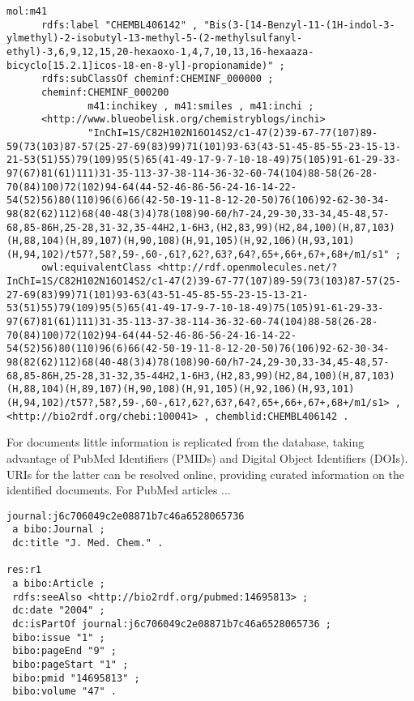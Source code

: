 \documentclass[sw]{iosart2c}
\begin{document}
\begin{tiny}
\begin{verbatim}
mol:m41
      rdfs:label "CHEMBL406142" , "Bis(3-[14-Benzyl-11-(1H-indol-3-ylmethyl)-2-isobutyl-13-methyl-5-(2-methylsulfanyl-ethyl)-3,6,9,12,15,20-hexaoxo-1,4,7,10,13,16-hexaaza-bicyclo[15.2.1]icos-18-en-8-yl]-propionamide)" ;
      rdfs:subClassOf cheminf:CHEMINF_000000 ;
      cheminf:CHEMINF_000200
              m41:inchikey , m41:smiles , m41:inchi ;
      <http://www.blueobelisk.org/chemistryblogs/inchi>
              "InChI=1S/C82H102N16O14S2/c1-47(2)39-67-77(107)89-59(73(103)87-57(25-27-69(83)99)71(101)93-63(43-51-45-85-55-23-15-13-21-53(51)55)79(109)95(5)65(41-49-17-9-7-10-18-49)75(105)91-61-29-33-97(67)81(61)111)31-35-113-37-38-114-36-32-60-74(104)88-58(26-28-70(84)100)72(102)94-64(44-52-46-86-56-24-16-14-22-54(52)56)80(110)96(6)66(42-50-19-11-8-12-20-50)76(106)92-62-30-34-98(82(62)112)68(40-48(3)4)78(108)90-60/h7-24,29-30,33-34,45-48,57-68,85-86H,25-28,31-32,35-44H2,1-6H3,(H2,83,99)(H2,84,100)(H,87,103)(H,88,104)(H,89,107)(H,90,108)(H,91,105)(H,92,106)(H,93,101)(H,94,102)/t57?,58?,59-,60-,61?,62?,63?,64?,65+,66+,67+,68+/m1/s1" ;
      owl:equivalentClass <http://rdf.openmolecules.net/?InChI=1S/C82H102N16O14S2/c1-47(2)39-67-77(107)89-59(73(103)87-57(25-27-69(83)99)71(101)93-63(43-51-45-85-55-23-15-13-21-53(51)55)79(109)95(5)65(41-49-17-9-7-10-18-49)75(105)91-61-29-33-97(67)81(61)111)31-35-113-37-38-114-36-32-60-74(104)88-58(26-28-70(84)100)72(102)94-64(44-52-46-86-56-24-16-14-22-54(52)56)80(110)96(6)66(42-50-19-11-8-12-20-50)76(106)92-62-30-34-98(82(62)112)68(40-48(3)4)78(108)90-60/h7-24,29-30,33-34,45-48,57-68,85-86H,25-28,31-32,35-44H2,1-6H3,(H2,83,99)(H2,84,100)(H,87,103)(H,88,104)(H,89,107)(H,90,108)(H,91,105)(H,92,106)(H,93,101)(H,94,102)/t57?,58?,59-,60-,61?,62?,63?,64?,65+,66+,67+,68+/m1/s1> , <http://bio2rdf.org/chebi:100041> , chemblid:CHEMBL406142 .
\end{verbatim}
\end{tiny}

For documents little information is replicated from the database, taking advantage
of PubMed Identifiers (PMIDs) and Digital Object Identifiers (DOIs). URIs for the
latter can be resolved online, providing curated information on the identified
documents. For PubMed articles ...

\begin{tiny}
\begin{verbatim}
journal:j6c706049c2e08871b7c46a6528065736
 a bibo:Journal ;
 dc:title "J. Med. Chem." .

res:r1
 a bibo:Article ;
 rdfs:seeAlso <http://bio2rdf.org/pubmed:14695813> ;
 dc:date "2004" ;
 dc:isPartOf journal:j6c706049c2e08871b7c46a6528065736 ;
 bibo:issue "1" ;
 bibo:pageEnd "9" ;
 bibo:pageStart "1" ;
 bibo:pmid "14695813" ;
 bibo:volume "47" .
\end{verbatim}
\end{tiny}
\end{document}
